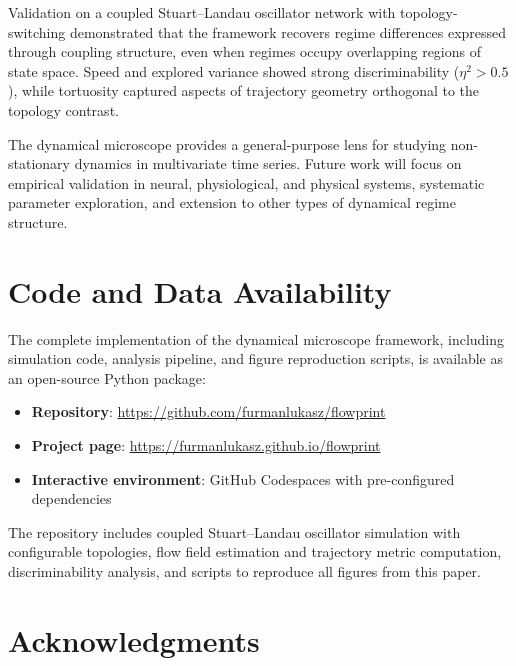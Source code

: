 \documentclass[5p,twocolumn,authoryear]{elsarticle}
\begin{document}
Validation on a coupled Stuart--Landau oscillator network with topology-switching demonstrated that the framework recovers regime differences expressed through coupling structure, even when regimes occupy overlapping regions of state space. Speed and explored variance showed strong discriminability ($\eta^2 > 0.5$), while tortuosity captured aspects of trajectory geometry orthogonal to the topology contrast.

The dynamical microscope provides a general-purpose lens for studying non-stationary dynamics in multivariate time series. Future work will focus on empirical validation in neural, physiological, and physical systems, systematic parameter exploration, and extension to other types of dynamical regime structure.

\section*{Code and Data Availability}

The complete implementation of the dynamical microscope framework, including simulation code, analysis pipeline, and figure reproduction scripts, is available as an open-source Python package:

\begin{itemize}
    \item \textbf{Repository}: \url{https://github.com/furmanlukasz/flowprint}
    \item \textbf{Project page}: \url{https://furmanlukasz.github.io/flowprint}
    \item \textbf{Interactive environment}: GitHub Codespaces with pre-configured dependencies
\end{itemize}

\noindent The repository includes coupled Stuart--Landau oscillator simulation with configurable topologies, flow field estimation and trajectory metric computation, discriminability analysis, and scripts to reproduce all figures from this paper.

\section*{Acknowledgments}

\appendix
\end{document}
